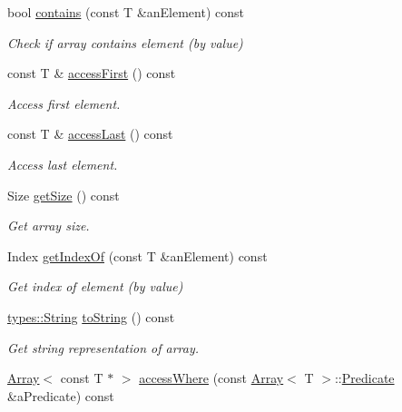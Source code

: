 \begin{DoxyCompactItemize}
bool \hyperlink{classlibrary_1_1core_1_1ctnr_1_1_array_a9c423eb8a34dddc81e0ede9435094e99}{contains} (const T \&an\+Element) const
\begin{DoxyCompactList}\small\item\em Check if array contains element (by value) \end{DoxyCompactList}\item 
const T \& \hyperlink{classlibrary_1_1core_1_1ctnr_1_1_array_afea012716d6cfffa2803606c0b244419}{access\+First} () const
\begin{DoxyCompactList}\small\item\em Access first element. \end{DoxyCompactList}\item 
const T \& \hyperlink{classlibrary_1_1core_1_1ctnr_1_1_array_ad95dcce8ddaf163903a2327f766dbc8a}{access\+Last} () const
\begin{DoxyCompactList}\small\item\em Access last element. \end{DoxyCompactList}\item 
Size \hyperlink{classlibrary_1_1core_1_1ctnr_1_1_array_a049307129c77f461b37ddca47edc7913}{get\+Size} () const
\begin{DoxyCompactList}\small\item\em Get array size. \end{DoxyCompactList}\item 
Index \hyperlink{classlibrary_1_1core_1_1ctnr_1_1_array_aa8a3e2745d72db8181b42e3cfb55415c}{get\+Index\+Of} (const T \&an\+Element) const
\begin{DoxyCompactList}\small\item\em Get index of element (by value) \end{DoxyCompactList}\item 
\hyperlink{classlibrary_1_1core_1_1types_1_1_string}{types\+::\+String} \hyperlink{classlibrary_1_1core_1_1ctnr_1_1_array_a90622afd5860fedd7d04e6518c096ffa}{to\+String} () const
\begin{DoxyCompactList}\small\item\em Get string representation of array. \end{DoxyCompactList}\item 
\hyperlink{classlibrary_1_1core_1_1ctnr_1_1_array}{Array}$<$ const T $\ast$ $>$ \hyperlink{classlibrary_1_1core_1_1ctnr_1_1_array_a5359c59d344a6147c7c6ea1012411011}{access\+Where} (const \hyperlink{classlibrary_1_1core_1_1ctnr_1_1_array}{Array}$<$ T $>$\+::\hyperlink{classlibrary_1_1core_1_1ctnr_1_1_array_a74cd325a740870aea490b6b739aa06ae}{Predicate} \&a\+Predicate) const

\end{DoxyCompactItemize}

